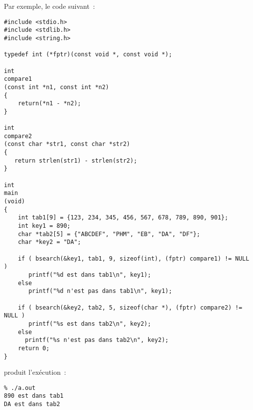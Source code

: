 Par exemple, le code suivant~:
\begin{verbatim}
#include <stdio.h>
#include <stdlib.h>
#include <string.h> 

typedef int (*fptr)(const void *, const void *);

int 
compare1
(const int *n1, const int *n2) 
{
    return(*n1 - *n2);
}

int 
compare2
(const char *str1, const char *str2) 
{
   return strlen(str1) - strlen(str2);
}

int
main
(void) 
{
    int tab1[9] = {123, 234, 345, 456, 567, 678, 789, 890, 901};
    int key1 = 890;
    char *tab2[5] = {"ABCDEF", "PHM", "EB", "DA", "DF"};
    char *key2 = "DA";

    if ( bsearch(&key1, tab1, 9, sizeof(int), (fptr) compare1) != NULL )
       printf("%d est dans tab1\n", key1);
    else
       printf("%d n'est pas dans tab1\n", key1);

    if ( bsearch(&key2, tab2, 5, sizeof(char *), (fptr) compare2) != NULL )
       printf("%s est dans tab2\n", key2);
    else
      printf("%s n'est pas dans tab2\n", key2);
    return 0;
}
\end{verbatim}
produit l'ex\'ecution~:
\begin{verbatim}
% ./a.out
890 est dans tab1
DA est dans tab2
\end{verbatim}
\ifcorrection%
\begin{correction}

\end{correction}
\fi
